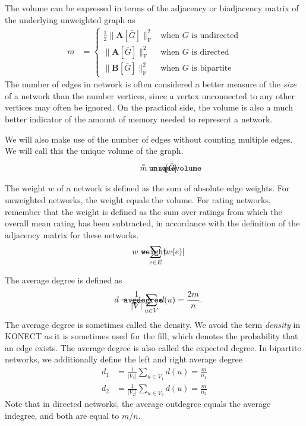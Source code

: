 \documentclass{article}
\def\mathnote#1{%
  \tag*{\rlap{\hspace\marginparsep\smash{\parbox[t]{\marginparwidth}{#1}}}}
}
\begin{document}
The volume can be expressed in terms of
the adjacency or biadjacency matrix of the underlying unweighted graph as
\begin{align}
  m &= \left\{ \begin{array}{ll}
    \frac 1 2 \| \mathbf A[\bar G] \|_{\mathrm F} ^2 &
    \text{when $G$ is undirected} \\
    \| \mathbf A[\bar G] \| _{\mathrm F} ^2 &
    \text{when $G$ is directed} \\
    \| \mathbf B[\bar G] \| _{\mathrm F} ^2 &    
    \text{when $G$ is bipartite}
    \end{array} \right.
\end{align}
The number of edges in network is often considered a better measure of
the \emph{size} of a network than the number vertices, since a vertex
unconnected to any other vertices may often be ignored.  On the
practical side, the volume is also a much better indicator of the amount
of memory needed to represent a network.

We will also make use of the number of edges without counting multiple
edges.  We will call this the unique volume of the graph. 
\begin{align}
  \mathnote{\texttt{uniquevolume}}
  \bar{\bar m} &= m[\bar{\bar{G}}]
\end{align}

The weight $w$ of a network is defined as the sum of absolute edge weights.  For
unweighted networks, the weight equals the volume. For rating networks,
remember that the weight is defined as the sum over ratings from which the overall
mean rating has been subtracted, in accordance with the definition of
the adjacency matrix for these networks. 
\begin{align}
  \mathnote{\texttt{weight}}
  w &= \sum_{e \in E} |w(e)|
\end{align}

The average degree is defined as
\begin{align}
  \mathnote{\texttt{avgdegree}}
  d &= \frac 1 {|V|} \sum_{u\in V} d(u) = \frac {2m} n . 
\end{align}
The average degree is sometimes called the density.  We avoid the term
\emph{density} in KONECT as it is sometimes used for the fill, which
denotes the probability that an edge exists.  The average degree is also
called the expected degree.  
In bipartite networks, we
additionally define the left and right average degree
\begin{align}
  d_1 &= \frac 1 {|V_1|} \sum_{u \in V_1} d(u) = \frac m {n_1} \\
  d_2 &= \frac 1 {|V_2|} \sum_{u \in V_2} d(u) = \frac m {n_2} 
\end{align}
Note that in directed networks, the average outdegree equals the average
indegree, and both are equal to $m/n$. 
\end{document}
